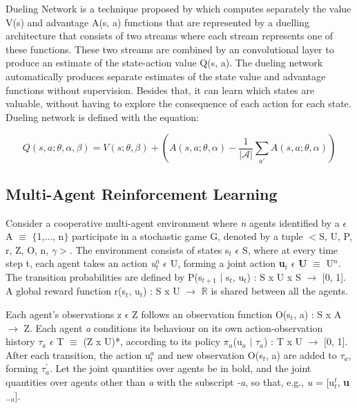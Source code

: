 \documentclass{llncs}
\begin{document}
Dueling Network is a technique proposed by \cite{Wang2016} which computes separately the value V(s) and advantage A(s, a) functions that are represented by a duelling architecture that consists of two streams where each stream represents one of these functions. These two streams are combined by an convolutional layer to produce an estimate of the state-action value Q(s, a). The dueling network automatically produces separate estimates of the state value and advantage functions without supervision. Besides that, it can learn which states are valuable, without having to explore the consequence of each action for each state. Dueling network is defined with the equation:

\begin{equation} \label{eq:dueling eq}
Q(s,a;\theta,\alpha,\beta) = V(s;\theta,\beta) + \left( A\left(s,a;\theta,\alpha \right) - \frac{1}{|\mathcal{A}|} \displaystyle\sum_{a'} A\left(s,a;\theta,\alpha \right) \right) 
\end{equation}
	
\subsection{Multi-Agent Reinforcement Learning} \label{sec:MARL}

Consider a cooperative multi-agent environment where \textit{n} agents identified by a $\epsilon$ A $\equiv$ $\{$1,..., n$\}$ participate in a stochastic game G, denoted by a tuple $<$S, U, P, r, Z, O, n, $\gamma>$. The environment consists of states s$_{t}$ $\epsilon$ S, where at every time step t, each agent takes an action \textit{u$^{a}_{t}$} $\epsilon$ U, forming a joint action \textbf{u$_{t}$} $\epsilon$ \textbf{U} $\equiv$ U$^{n}$.
The transition probabilities are defined by P(s$_{t+1}$ $|$ s$_{t}$, u$_{t}$) : S x U x S $\rightarrow$ [0, 1]. A global reward function r(s$_{t}$, u$_{t}$) : S x U $\rightarrow$ $\mathbb{R}$ is shared between all the agents.

Each agent's observations z $\epsilon$ Z follows an observation function O(s$_{t}$, a) : S x A $\rightarrow$ Z. Each agent \textit{a} conditions its behaviour on its own action-observation history $\tau_{a}$ $\epsilon$ T $\equiv$ (Z x U)*, according to its policy $\pi_{a}$(u$_{a}$ $|$ $\tau_{a}$) : T x U $\rightarrow$ [0, 1]. After each transition, the action u$_{t}^{a}$ and new observation O(s$_{t}$, a) are added to $\tau_{a}$, forming $\tau_{a}^{'}$. Let the joint quantities over agents be in bold, and the joint quantities over agents other than \textit{a} with the subscript \textit{-a}, so that, e.g., \emph{u} = [u$_{t}^{t}$, \textbf{u}$_{-a}$].
\end{document}
